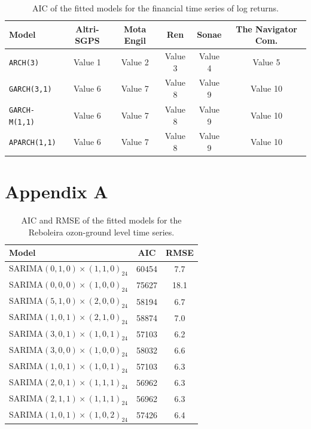 \documentclass{article}
\begin{document}
\begin{table}[htbp]
  \centering
  \begin{tabular}{lccccc}
    \toprule
    \textbf{Model} & \textbf{Altri-SGPS} & \textbf{Mota Engil} & \textbf{Ren} & \textbf{Sonae} & \textbf{The Navigator Com.} \\
    \midrule
    \verb|ARCH(3)|& Value 1 & Value 2 & Value 3 & Value 4 & Value 5 \\ \hline 
    \verb|GARCH(3,1)|  & Value 6 & Value 7 & Value 8 & Value 9 & Value 10 \\ \hline
    \verb|GARCH-M(1,1)|  & Value 6 & Value 7 & Value 8 & Value 9 & Value 10 \\ \hline
    \verb|APARCH(1,1)|  & Value 6 & Value 7 & Value 8 & Value 9 & Value 10 \\ 
    \bottomrule
  \end{tabular}
  \caption{AIC of the fitted models for the financial time series of log returns.}
  \label{model:fs}
\end{table}




\appendix

\section{Appendix A}

\begin{table}
    \centering
    \begin{tabular}{|l|c|c|}
    \toprule
    \textbf{Model} & \textbf{AIC} & \textbf{RMSE} \\
    \midrule 
    SARIMA$(0,1,0) \times (1,1,0)_{24}$ & 60454 & 7.7 \\
    SARIMA$(0,0,0) \times (1,0,0)_{24}$ & 75627 & 18.1 \\
    SARIMA$(5,1,0) \times (2,0,0)_{24}$ & 58194 & 6.7 \\
    SARIMA$(1,0,1) \times (2,1,0)_{24}$ & 58874 & 7.0 \\
    SARIMA$(3,0,1) \times (1,0,1)_{24}$ & 57103 & 6.2 \\
    SARIMA$(3,0,0) \times (1,0,0)_{24}$ & 58032 & 6.6 \\
    SARIMA$(1,0,1) \times (1,0,1)_{24}$ & 57103 & 6.3 \\
    SARIMA$(2,0,1) \times (1,1,1)_{24}$ & 56962 & 6.3 \\
    SARIMA$(2,1,1) \times (1,1,1)_{24}$ & 56962 & 6.3 \\
    SARIMA$(1,0,1) \times (1,0,2)_{24}$ & 57426 & 6.4 \\
    \bottomrule
    \end{tabular}
    \caption{AIC and RMSE of the fitted models for the Reboleira ozon-ground level time series.}
    \label{tab:Reboleira}
\end{table}
\end{document}
